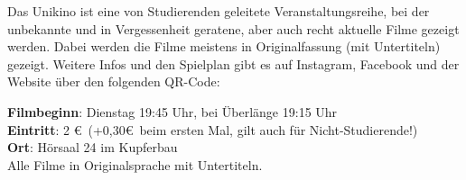 Das Unikino ist eine von Studierenden geleitete Veranstaltungsreihe, bei der
unbekannte und in Vergessenheit geratene, aber auch recht aktuelle Filme
gezeigt werden. Dabei werden die Filme meistens in Originalfassung (mit
Untertiteln) gezeigt. Weitere Infos und den Spielplan gibt es auf Instagram,
Facebook und der Website über den folgenden QR-Code:








\textbf{Filmbeginn}: Dienstag 19:45 Uhr, bei Überlänge 19:15 Uhr\\
\textbf{Eintritt}: 2 \euro ~(+0,30\euro \ beim ersten Mal, gilt auch für Nicht-Studierende!)\\
\textbf{Ort}: Hörsaal 24 im Kupferbau\\
Alle Filme in Originalsprache mit Untertiteln.

\normalsize
